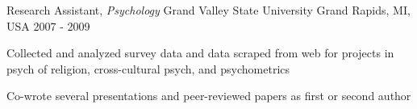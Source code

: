 \begin{cventries}
 \cventry
    {Research Assistant, \textit{Psychology}} %
    {Grand Valley State University} %
    {Grand Rapids, MI, USA} %
    {2007 - 2009} %
   {
    \begin{cvitems}
    \item {Collected and analyzed survey data and data scraped from web for projects in psych of religion, cross-cultural psych, and psychometrics}
    \item {Co-wrote several presentations and peer-reviewed papers as first or second author} 
    \end{cvitems}
    }
\end{cventries}
